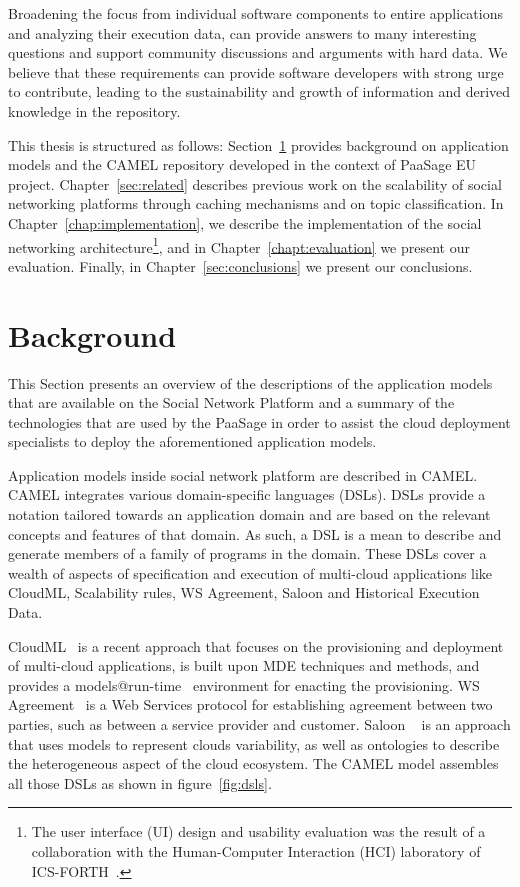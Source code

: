 Broadening the focus from individual software components to entire applications and analyzing their execution data, can provide answers to many interesting questions and support community discussions and arguments with hard data. 
We believe that these requirements can provide software developers with strong urge to contribute, leading to the sustainability and growth of information and derived knowledge in the repository.

This thesis is structured as follows: Section~\ref{sec:background} provides background on application models and the CAMEL repository developed in the context of PaaSage EU project. Chapter~\ref{sec:related} describes previous work on the scalability of social networking platforms through caching mechanisms and on topic classification. In Chapter~\ref{chap:implementation}, we describe the implementation of the social networking architecture\footnote{The user interface (UI) design and usability evaluation was the result of a collaboration with the Human-Computer Interaction (HCI) laboratory of ICS-FORTH~\cite{magoutis2015design}.}, and in Chapter~\ref{chapt:evaluation} we present our evaluation. Finally, in Chapter~\ref{sec:conclusions} we present our conclusions.

\section{Background}
\label{sec:background}
This Section presents an overview of the descriptions of the application models that are available on the Social Network Platform and a summary of the technologies that are used by the PaaSage in order to assist the cloud deployment specialists to deploy the aforementioned application models.

Application models inside social network platform are described in CAMEL. CAMEL integrates various domain-specific languages (DSLs).
DSLs provide a notation tailored towards an application domain and are based on the relevant concepts and features of that domain. As such, a DSL is a mean to describe and generate members of a family of programs in the domain. 
These DSLs cover a wealth of aspects of specification and execution of multi-cloud applications like CloudML, Scalability rules, WS Agreement, Saloon and Historical Execution Data. 

CloudML~\cite{FerryRossiniCMS13} is a recent approach that focuses on the provisioning and deployment of multi-cloud applications, is built upon MDE techniques and methods, and provides a models@run-time~\cite{models-runtime} environment for enacting the provisioning.  WS Agreement~\cite{andrieux2007web} is a Web Services protocol for establishing agreement between two parties, such as between a service provider and customer. Saloon ~\cite{quinton2013towards} is an approach that uses models to represent clouds variability, as well as ontologies to describe the heterogeneous aspect of the cloud ecosystem. The CAMEL model assembles all those DSLs as shown in figure~\ref{fig:dsls}.

